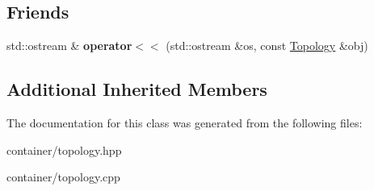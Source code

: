\subsection*{Friends}
\begin{DoxyCompactItemize}
\item 
\mbox{\label{classTopology_a6cd9eecf891bc3fcc4074b52de52c1fc}} 
std\+::ostream \& {\bfseries operator$<$$<$} (std\+::ostream \&os, const \mbox{\hyperlink{classTopology}{Topology}} \&obj)
\end{DoxyCompactItemize}
\subsection*{Additional Inherited Members}


The documentation for this class was generated from the following files\+:\begin{DoxyCompactItemize}
\item 
container/topology.\+hpp\item 
container/topology.\+cpp\end{DoxyCompactItemize}
